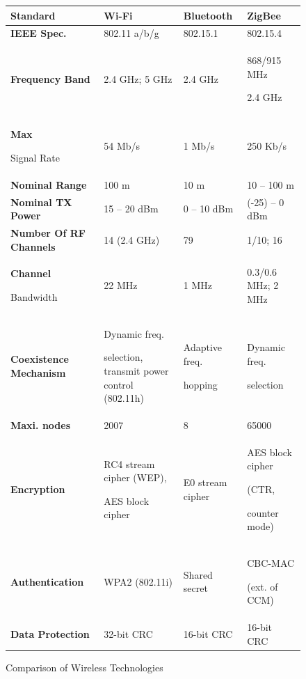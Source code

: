 \begin{figure}
	\begin{center}
		\label{fig:WirelessComparison}
\begin{tabularx}{1\textwidth}{>{\bfseries}p{}||p{}|p{}|p{}}
\hline Standard 			& Wi-Fi & Bluetooth & ZigBee  \\\hline
\hline IEEE Spec. 			& 802.11 a/b/g & 802.15.1  & 802.15.4  \\
\hline Frequency Band 		& 2.4 GHz; 5 GHz & 2.4 GHz & 868/915 MHz\par2.4 GHz  \\
\hline Max \par Signal Rate 		& 54 Mb/s & 1 Mb/s & 250 Kb/s \\
\hline Nominal Range 		& 100 m & 10 m & 10 – 100 m  \\
\hline Nominal TX Power 	& 15 – 20 dBm & 0 – 10 dBm & (-25) – 0 dBm \\
\hline Number Of RF Channels & 14 (2.4 GHz) & 79  &  1/10; 16 \\
\hline Channel \par Bandwidth 	& 22 MHz & 1 MHz  & 0.3/0.6 MHz; 2 MHz \\
\hline Coexistence Mechanism& Dynamic freq. \par selection, transmit power control (802.11h) & Adaptive freq.\par hopping & Dynamic freq. \par selection  \\
\hline Maxi. nodes & 2007 & 8 & 65000 \\
\hline Encryption 			& RC4 stream cipher (WEP),\par AES block cipher & E0 stream cipher & AES block cipher \par(CTR,\par counter mode) \\
\hline Authentication 		& WPA2 (802.11i) & Shared secret & CBC-MAC \par(ext. of CCM) \\
\hline Data Protection 		& 32-bit CRC & 16-bit CRC &  16-bit CRC \\
\hline 
\end{tabularx} 
		\caption{Comparison of Wireless Technologies}
	\end{center}
\end{figure}


